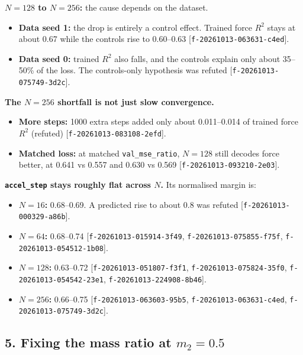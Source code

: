 \documentclass{article}
\begin{document}
\textbf{$N = 128$ to $N = 256$:} the cause depends on the dataset.

\begin{itemize}
\item \textbf{Data seed 1:} the drop is entirely a control effect. Trained force $R^2$ stays at about 0.67 while the controls rise to 0.60–0.63 [\texttt{f-20261013-063631-c4ed}].
\item \textbf{Data seed 0:} trained $R^2$ also falls, and the controls explain only about 35–50\% of the loss. The controls-only hypothesis was refuted [\texttt{f-20261013-075749-3d2c}].
\end{itemize}

\textbf{The $N = 256$ shortfall is not just slow convergence.}

\begin{itemize}
\item \textbf{More steps:} 1000 extra steps added only about 0.011–0.014 of trained force $R^2$ (refuted) [\texttt{f-20261013-083108-2efd}].
\item \textbf{Matched loss:} at matched \texttt{val\_mse\_ratio}, $N = 128$ still decodes force better, at 0.641 vs 0.557 and 0.630 vs 0.569 [\texttt{f-20261013-093210-2e03}].
\end{itemize}

\textbf{\texttt{accel\_step} stays roughly flat across $N$.} Its normalised margin is:

\begin{itemize}
\item \textbf{$N = 16$:} 0.68–0.69. A predicted rise to about 0.8 was refuted [\texttt{f-20261013-000329-a86b}].
\item \textbf{$N = 64$:} 0.68–0.74 [\texttt{f-20261013-015914-3f49}, \texttt{f-20261013-075855-f75f}, \texttt{f-20261013-054512-1b08}].
\item \textbf{$N = 128$:} 0.63–0.72 [\texttt{f-20261013-051807-f3f1}, \texttt{f-20261013-075824-35f0}, \texttt{f-20261013-054542-23e1}, \texttt{f-20261013-224908-8b46}].
\item \textbf{$N = 256$:} 0.66–0.75 [\texttt{f-20261013-063603-95b5}, \texttt{f-20261013-063631-c4ed}, \texttt{f-20261013-075749-3d2c}].
\end{itemize}

\subsection{5. Fixing the mass ratio at $m_2 = 0.5$}
\end{document}
